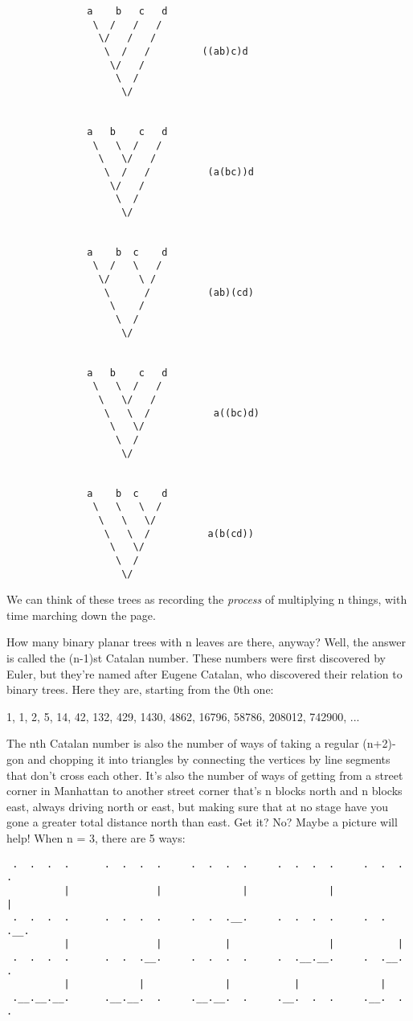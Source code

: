 \begin{verbatim}
              a    b   c   d
               \  /   /   /
                \/   /   /
                 \  /   /         ((ab)c)d
                  \/   /
                   \  /
                    \/


              a   b    c   d
               \   \  /   /
                \   \/   /
                 \  /   /          (a(bc))d
                  \/   /
                   \  /
                    \/


              a    b  c    d
               \  /   \   /
                \/     \ /
                 \      /          (ab)(cd)
                  \    /
                   \  /
                    \/


              a   b    c   d
               \   \  /   /
                \   \/   /
                 \   \  /           a((bc)d)
                  \   \/
                   \  /
                    \/


              a    b  c    d
               \   \   \  /
                \   \   \/
                 \   \  /          a(b(cd))
                  \   \/
                   \  /
                    \/

\end{verbatim}
    
We can think of these trees as recording the \emph{process} of multiplying 
n things, with time marching down the page. 

How many binary planar trees with n leaves are there, anyway?  Well,
the answer is called the (n-1)st Catalan number.  These numbers
were first discovered by Euler, but they're named after Eugene Catalan, 
who discovered their relation to binary trees.  Here they are, starting 
from the 0th one:

1, 1, 2, 5, 14, 42, 132, 429, 1430, 4862, 16796, 58786, 208012, 742900, ...

The nth Catalan number is also the number of ways of taking a regular
(n+2)-gon and chopping it into triangles by connecting the vertices by
line segments that don't cross each other.   It's also the number of ways
of getting from a street corner in Manhattan to another street corner
that's n blocks north and n blocks east, always driving north or east, 
but making sure that at no stage have you gone a greater total distance 
north than east.  Get it?  No?  Maybe a picture will help!  When n = 3, 
there are 5 ways:

\begin{verbatim}
 .  .  .  .      .  .  .  .     .  .  .  .     .  .  .  .     .  .  .  .
          |               |              |              |              |
 .  .  .  .      .  .  .  .     .  .  .__.     .  .  .  .     .  .  .__.
          |               |           |                 |           |
 .  .  .  .      .  .  .__.     .  .  .  .     .  .__.__.     .  .__.  .
          |            |              |           |              |
 .__.__.__.      .__.__.  .     .__.__.  .     .__.  .  .     .__.  .  .
\end{verbatim}
    
